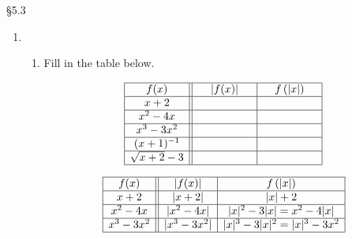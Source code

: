 \documentclass[11pt]{book}
\theoremstyle{definition}  %
\begin{document}
\renewcommand{\textinterrobang}{$! \! \! ?$}






\S 5.3


\begin{enumerate}

\item 

\begin{enumerate}

\item  Fill in the table below.

\[ \begin{array}{|c||c|c|}

\hline

f(x) & |f(x)| & f\left(|x| \right)  \\ \hline

x+2 &      \hphantom{\sqrt{x+3}-2}   &         \hphantom{\sqrt{x+3}-2}      \\ \hline

x^2-4x &      \hphantom{\sqrt{x+3}-2}      &      \hphantom{\sqrt{x+3}-2}       \\  \hline

x^3-3x^2 &     \hphantom{\sqrt{x+3}-2}       &    \hphantom{\sqrt{x+3}-2}       \\  \hline  

(x+1)^{-1}  &      \hphantom{\sqrt{x+3}-2}      &    \hphantom{\sqrt{x+3}-2}       \\  \hline   

\sqrt{x+2}-3&    \hphantom{\sqrt{x+3}-2}        &     \hphantom{\sqrt{x+3}-2}      \\  \hline   

 \end{array} \]
 
 \[ \begin{array}{|c||c|c|}

\hline

f(x) & |f(x)| & f\left(|x| \right)  \\ \hline

x+2 &     |x+2|   &       |x|+2      \\ \hline

x^2-4x &    |x^2-4x|      &     |x|^2-3|x| = x^2-4|x|      \\  \hline

x^3-3x^2 &    |x^3-3x^2|     &  |x|^3-3|x|^2 = |x|^3-3x^2      \\  \hline  


\end{array}\]
\end{enumerate}
\end{enumerate}
\end{document}
